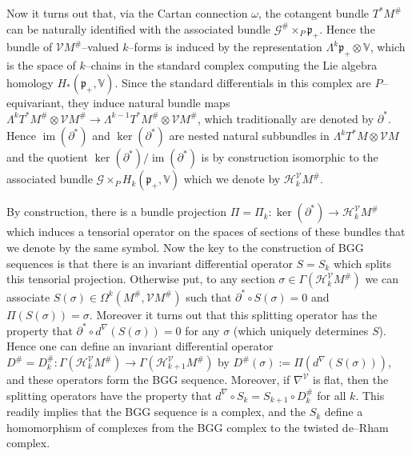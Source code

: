 \documentclass[12pt,a4paper]{amsart}
\def\frak{\mathfrak}
\def\Bbb{\mathbb}
\def\Cal{\mathcal}
\newcommand{\x}{\times}
\renewcommand{\o}{\circ}
\newcommand{\om}{\omega}
\newcommand{\si}{\sigma}
\newcommand{\Ga}{\Gamma}
\newcommand{\La}{\Lambda}
\newcommand{\Om}{\Omega}
\renewcommand{\Im}{\operatorname{im}}
\numberwithin{theorem}{section}
\theoremstyle{definition}
\theoremstyle{remark}
\begin{document}
Now it turns out that, via the Cartan connection $\om$, the cotangent
bundle $T^*M^\#$ can be naturally identified with the associated
bundle $\Cal G^\#\x_P\frak p_+$. Hence the bundle of $\Cal
VM^\#$--valued $k$--forms is induced by the representation $\La^k\frak
p_+\otimes\Bbb V$, which is the space of $k$--chains in the standard
complex computing the Lie algebra homology $H_*(\frak p_+,\Bbb
V)$. Since the standard differentials in this complex are
$P$--equivariant, they induce natural bundle maps
$\La^kT^*M^\#\otimes\Cal VM^\#\to \La^{k-1}T^*M^\#\otimes\Cal VM^\#$,
which traditionally are denoted by $\partial^*$. Hence
$\Im(\partial^*)$ and $\ker(\partial^*)$ are nested natural subbundles
in $\La^kT^*M\otimes\Cal VM$ and the quotient
$\ker(\partial^*)/\Im(\partial^*)$ is by construction isomorphic to
the associated bundle $\Cal G\x_PH_k(\frak p_+,\Bbb V)$ which we
denote by $\Cal H^{\Cal V}_kM^\#$.

By construction, there is a bundle projection
$\Pi=\Pi_k:\ker(\partial^*)\to \Cal H^{\Cal V}_kM^\#$ which induces a
tensorial operator on the spaces of sections of these bundles that we
denote by the same symbol. Now the key to the construction of BGG
sequences is that there is an invariant differential operator $S=S_k$
which splits this tensorial projection. Otherwise put, to any section
$\si\in\Ga(\Cal H^{\Cal V}_kM^\#)$ we can associate
$S(\si)\in\Om^k(M^\#,\Cal VM^\#)$ such that $\partial^*\o S(\si)=0$
and $\Pi(S(\si))=\si$. Moreover it turns out that this splitting
operator has the property that $\partial^*\o d^\nabla(S(\si))=0$ for
any $\si$ (which uniquely determines $S$). Hence one can define an
invariant differential operator $D^\#=D_k^\#:\Ga(\Cal H^{\Cal
  V}_kM^\#)\to\Ga(\Cal H^{\Cal V}_{k+1}M^\#)$ by
$D^\#(\si):=\Pi(d^\nabla(S(\si)))$, and these operators form the BGG
sequence. Moreover, if $\nabla^{\Cal V}$ is flat, then the splitting
operators have the property that $d^\nabla\o S_k=S_{k+1}\o D^\#_k$ for
all $k$. This readily implies that the BGG sequence is a complex, and
the $S_k$ define a homomorphism of complexes from the BGG complex to
the twisted de--Rham complex.
\end{document}
